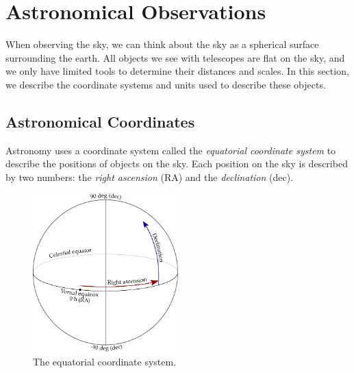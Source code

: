     \section{Astronomical Observations}
    \label{sec:astronomical-observations}

        When observing the sky, we can think about the sky as a spherical
        surface surrounding the earth. All objects we see with telescopes are
        flat on the sky, and we only have limited tools to determine their
        distances and scales. In this section, we describe the coordinate
        systems and units used to describe these objects.

        \subsection{Astronomical Coordinates}
        \label{sec:coordinates}

            Astronomy uses a coordinate system called the \emph{equatorial
            coordinate system} to describe the positions of objects on the sky.
            Each position on the sky is described by two numbers: the
            \emph{right ascension} (RA) and the \emph{declination} (dec).

            \begin{figure}[!ht]
                \centering
                \includegraphics[width=0.5\textwidth]{images/ra-dec}
                \caption{The equatorial coordinate system.}
                \label{fig:equatorial-coordinates}
            \end{figure}

